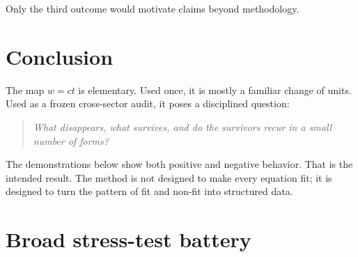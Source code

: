 \documentclass[10pt]{article}
\begin{document}
Only the third outcome would motivate claims beyond methodology.

\section{Conclusion}

The map \(w=ct\) is elementary. Used once, it is mostly a familiar
change of units. Used as a frozen cross-sector audit, it poses a
disciplined question:

\begin{quote}
\emph{What disappears, what survives, and do the survivors recur in
a small number of forms?}
\end{quote}

The demonstrations below show both positive and negative behavior.
That is the intended result. The method is not designed to make every
equation fit; it is designed to turn the pattern of fit and non-fit
into structured data.

\appendix

\section{Broad stress-test battery}
\label{app:battery}

\small
\setlength{\LTleft}{0pt}
\setlength{\LTright}{0pt}
\end{document}
